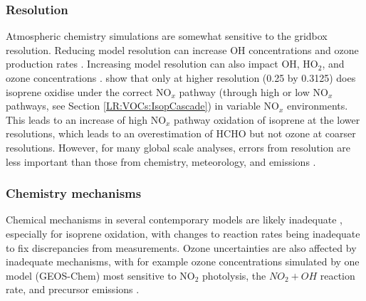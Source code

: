     \subsubsection{Resolution}
      \label{LR:Models:Uncert:Resolution}
      
      Atmospheric chemistry simulations are somewhat sensitive to the gridbox resolution.
      Reducing model resolution can increase OH concentrations and ozone production rates \parencite{Wild2006}.
      Increasing model resolution can also impact OH, HO$_2$, and ozone 
      concentrations \parencite[e.g.,][]{Christian2017}.
      \textcite{Yu2016} show that only at higher resolution (0.25 by 0.3125\degr) does isoprene oxidise under the correct NO$_x$ pathway (through high or low NO$_x$ pathways, see Section \ref{LR:VOCs:IsopCascade}) in variable NO$_x$ environments.
      This leads to an increase of high NO$_x$ pathway oxidation of isoprene at the lower resolutions, which leads to an overestimation of HCHO but not ozone at coarser resolutions.
      However, for many global scale analyses, errors from resolution are less important than those from chemistry, meteorology, and emissions \parencite{Christian2017, Christian2018}.
      
            
    \subsubsection{Chemistry mechanisms}
      \label{LR:Models:Uncert:Chemistry}
      
      
      Chemical mechanisms in several contemporary models are likely inadequate \parencite{Marvin2017}, especially for isoprene oxidation, with changes to reaction rates being inadequate to fix discrepancies from measurements.
      Ozone uncertainties are also affected by inadequate mechanisms, with for example ozone concentrations simulated by one model (GEOS-Chem) most sensitive to NO$_2$ photolysis, the $NO_2 + OH$ reaction rate, and precursor emissions \parencite{Christian2017}.
      
